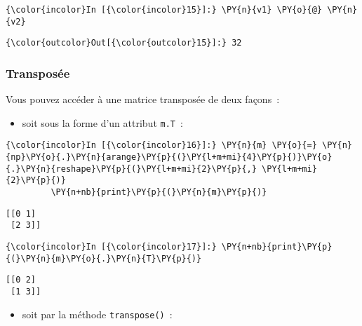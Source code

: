     \begin{Verbatim}[commandchars=\\\{\}]
{\color{incolor}In [{\color{incolor}15}]:} \PY{n}{v1} \PY{o}{@} \PY{n}{v2}
\end{Verbatim}


\begin{Verbatim}[commandchars=\\\{\}]
{\color{outcolor}Out[{\color{outcolor}15}]:} 32
\end{Verbatim}
            
    \hypertarget{transposuxe9e}{%
\subsubsection{Transposée}\label{transposuxe9e}}

    Vous pouvez accéder à une matrice transposée de deux façons~:

    \begin{itemize}
\tightlist
\item
  soit sous la forme d'un attribut \texttt{m.T}~:
\end{itemize}

    \begin{Verbatim}[commandchars=\\\{\}]
{\color{incolor}In [{\color{incolor}16}]:} \PY{n}{m} \PY{o}{=} \PY{n}{np}\PY{o}{.}\PY{n}{arange}\PY{p}{(}\PY{l+m+mi}{4}\PY{p}{)}\PY{o}{.}\PY{n}{reshape}\PY{p}{(}\PY{l+m+mi}{2}\PY{p}{,} \PY{l+m+mi}{2}\PY{p}{)}
         \PY{n+nb}{print}\PY{p}{(}\PY{n}{m}\PY{p}{)}
\end{Verbatim}


    \begin{Verbatim}[commandchars=\\\{\}]
[[0 1]
 [2 3]]

    \end{Verbatim}

    \begin{Verbatim}[commandchars=\\\{\}]
{\color{incolor}In [{\color{incolor}17}]:} \PY{n+nb}{print}\PY{p}{(}\PY{n}{m}\PY{o}{.}\PY{n}{T}\PY{p}{)}
\end{Verbatim}


    \begin{Verbatim}[commandchars=\\\{\}]
[[0 2]
 [1 3]]

    \end{Verbatim}

    \begin{itemize}
\tightlist
\item
  soit par la méthode \texttt{transpose()}~:
\end{itemize}

